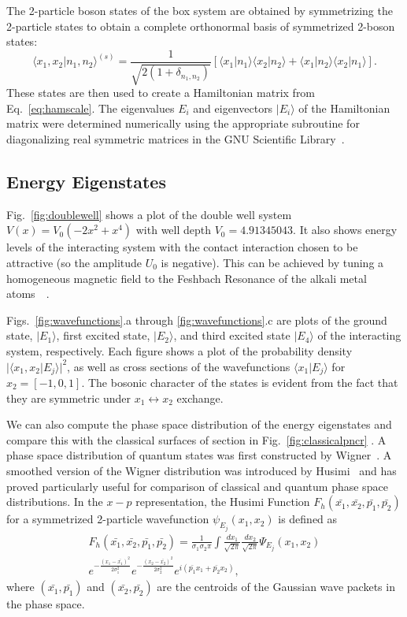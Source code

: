 \documentclass{article}
\begin{document}
The 2-particle boson states of the box system are obtained by symmetrizing the 2-particle states to obtain a complete orthonormal basis of symmetrized 2-boson states:
%
\begin{equation}
{\langle}x_1,x_2\vert n_1,n_2{\rangle} ^{(s)}=\frac{1}{\sqrt{2(1+\delta_{n_1,n_2})}} 
[{\langle}x_1|n_1\rangle{\langle}x_2|n_2\rangle +{\langle}x_1|n_2\rangle{\langle}x_2|n_1\rangle ].
\label{eq:symm}
\end{equation}
These states are then used to create a Hamiltonian matrix from Eq.~\eqref{eq:hamscale}. The eigenvalues $E_i$ and eigenvectors $\vert E_i \rangle$ of the Hamiltonian matrix were determined numerically using the appropriate subroutine for diagonalizing real symmetric matrices in the GNU Scientific Library~\cite{galassi:gsl}.  

%
%
\subsection{Energy Eigenstates}
%
%

Fig.~\ref{fig:doublewell} shows a plot of the double well system $V(x)=V_0 (-2 x^2+ x^4)$ with well depth $V_0=4.91345043$. It also shows energy levels of the interacting system with  the contact  interaction  chosen to be attractive (so the amplitude $U_0$ is negative). This can be achieved by tuning a homogeneous magnetic field to the Feshbach Resonance of the alkali metal atoms~\cite{feshbach:resonance}~\cite{pethick:bec}.

Figs.~\ref{fig:wavefunctions}.a through  \ref{fig:wavefunctions}.c are plots of the ground state, $|E_1\rangle$, first excited state, $|E_2\rangle$,  and third excited state $|E_4\rangle$ of the interacting system, respectively. Each figure shows a plot of the probability density $|\langle x_1,x_2|E_j\rangle|^2$, as well as cross sections of the wavefunctions $\langle x_1|E_j\rangle$ for $x_2=[-1,0,1]$. The bosonic character of the states is evident from the fact that they are symmetric under $x_1 \leftrightarrow x_2$ exchange. 

We can also compute the phase space distribution of the energy eigenstates and compare this with the classical surfaces of section in Fig.~\ref{fig:classicalpncr} .  A phase space distribution of quantum states was first constructed by Wigner~\cite{wigner}.  A smoothed version of the Wigner distribution was introduced by Husimi~\cite{husimi} and has proved particularly useful for comparison of classical and quantum phase space distributions. 
In the $x-p$ representation, the Husimi Function $F_h(\bar{x_1},\bar{x_2},\bar{p_1},\bar{p_2})$for a symmetrized 2-particle  wavefunction $\psi_{E_j}(x_1,x_2)$ is defined as
%
\begin{multline}
F_h(\bar{x_1},\bar{x_2},\bar{p_1},\bar{p_2})=\frac{1}{\sigma_1 \sigma_2 \pi} \int \frac{dx_1}{\sqrt{2\pi}} \frac{dx_2}{\sqrt{2\pi}} \Psi_{E_j}(x_1,x_2) \\
e^{-\frac{(x_1-\bar{x_1})^2}{2\sigma^2_1}} e^{-\frac{(x_2-\bar{x_2})^2}{2\sigma^2_2}} e^{i (\bar{p_1}x_1 + \bar{p_2}x_2)},
\label{eq:husimi}
\end{multline}
%
where $(\bar{x_1},\bar{p_1})$ and $(\bar{x_2},\bar{p_2})$ are the centroids  of the Gaussian wave packets in the phase space.  
\end{document}
